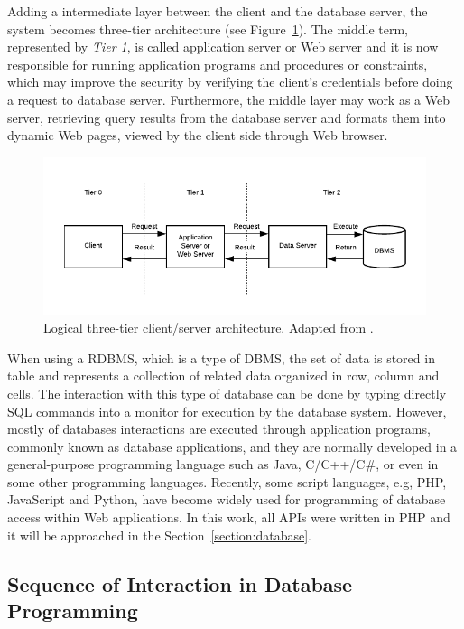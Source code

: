 Adding a intermediate layer between the client and the database server, the system becomes three-tier architecture (see Figure~\ref{fig:3tierClientServer}). The middle term, represented by \textit{Tier 1}, is called application server or Web server and it is now responsible for running application programs and procedures or constraints, which may improve the security by verifying the client's credentials before doing a request to database server. Furthermore, the middle layer may work as a Web server, retrieving query results from the database server and formats them into dynamic Web pages, viewed by the client side through Web browser. 

\begin{figure}[h!]
    \centering
    \includegraphics[scale=1.25]{images/study_of_tools/database/ThreeTierClientServer.pdf}
    \caption{Logical three-tier client/server architecture. Adapted from \cite{ELMASRI:2015}.}
    \label{fig:3tierClientServer}
\end{figure}

When using a \gls{RDBMS}, which is a type of \gls{DBMS}, the set of data is stored in table and represents a collection of related data organized in row, column and cells. The interaction with this type of database can be done by typing directly \gls{SQL} commands into a monitor for execution by the database system. However, mostly of databases interactions are executed through application programs, commonly known as database applications, and they are normally developed in a general-purpose programming language such as Java, C/C++/C\#, or even in some other programming languages. Recently, some script languages, e.g, \gls{PHP}, JavaScript and Python, have become widely used for programming of database access within Web applications. In this work, all \gls{API}s were written in \gls{PHP} and it will be approached in the Section~\ref{section:database}.


\subsection{Sequence of Interaction in Database Programming}\label{sequenceOfInteraction}

